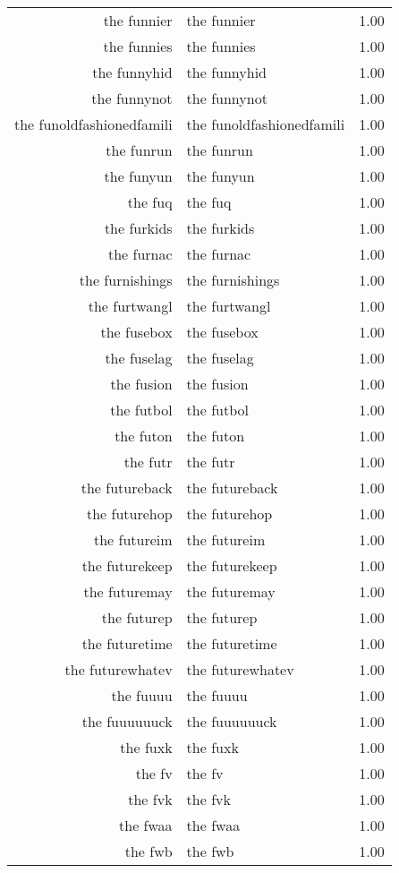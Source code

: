 \begin{table}[ht]
\begin{tabular}{rlr}
  the funnier & the funnier & 1.00 \\ 
  the funnies & the funnies & 1.00 \\ 
  the funnyhid & the funnyhid & 1.00 \\ 
  the funnynot & the funnynot & 1.00 \\ 
  the funoldfashionedfamili & the funoldfashionedfamili & 1.00 \\ 
  the funrun & the funrun & 1.00 \\ 
  the funyun & the funyun & 1.00 \\ 
  the fuq & the fuq & 1.00 \\ 
  the furkids & the furkids & 1.00 \\ 
  the furnac & the furnac & 1.00 \\ 
  the furnishings & the furnishings & 1.00 \\ 
  the furtwangl & the furtwangl & 1.00 \\ 
  the fusebox & the fusebox & 1.00 \\ 
  the fuselag & the fuselag & 1.00 \\ 
  the fusion & the fusion & 1.00 \\ 
  the futbol & the futbol & 1.00 \\ 
  the futon & the futon & 1.00 \\ 
  the futr & the futr & 1.00 \\ 
  the futureback & the futureback & 1.00 \\ 
  the futurehop & the futurehop & 1.00 \\ 
  the futureim & the futureim & 1.00 \\ 
  the futurekeep & the futurekeep & 1.00 \\ 
  the futuremay & the futuremay & 1.00 \\ 
  the futurep & the futurep & 1.00 \\ 
  the futuretime & the futuretime & 1.00 \\ 
  the futurewhatev & the futurewhatev & 1.00 \\ 
  the fuuuu & the fuuuu & 1.00 \\ 
  the fuuuuuuck & the fuuuuuuck & 1.00 \\ 
  the fuxk & the fuxk & 1.00 \\ 
  the fv & the fv & 1.00 \\ 
  the fvk & the fvk & 1.00 \\ 
  the fwaa & the fwaa & 1.00 \\ 
  the fwb & the fwb & 1.00 \\ 

\end{tabular}
\end{table}
